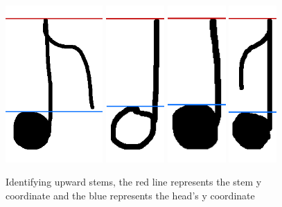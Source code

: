 \begin{figure}[h!]
    \centering
    \includegraphics[height=6cm]{gfx/techniques/scoring/note-stem-up/4247.png}
    \quad
    \includegraphics[height=6cm]{gfx/techniques/scoring/note-stem-up/6028.png}
    \quad
    \includegraphics[height=6cm]{gfx/techniques/scoring/note-stem-up/6042.png}
    \quad
    \includegraphics[height=6cm]{gfx/techniques/scoring/note-stem-up/6111.png}

    \caption{Identifying upward stems, the red line represents the stem y  coordinate and the blue represents the head's y coordinate}
    \label{fig:downward-stem-identification}
\end{figure}

